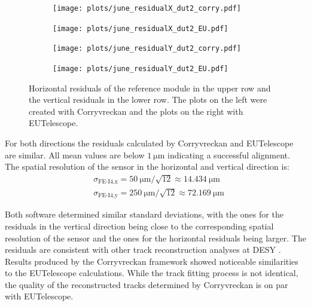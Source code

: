 \begin{figure}[H]
  \hspace{-0.4cm}
  \begin{subfigure}{0.51\textwidth}
      \texttt{[image: plots/june\_residualX\_dut2\_corry.pdf]}
  \end{subfigure}
  \begin{subfigure}{0.51\textwidth}
      \hspace{-0.19cm}
      \texttt{[image: plots/june\_residualX\_dut2\_EU.pdf]}
  \end{subfigure}
  \begin{subfigure}{0.51\textwidth}
    \hspace{-0.4cm}
      \texttt{[image: plots/june\_residualY\_dut2\_corry.pdf]}
  \end{subfigure}
  \begin{subfigure}{0.51\textwidth}
    \hspace{-0.4cm}
      \hspace{-0.19cm}
      \texttt{[image: plots/june\_residualY\_dut2\_EU.pdf]}
  \end{subfigure}
  \caption{Horizontal residuals of the reference module in the upper row and the vertical residuals in the lower row. The plots on the left
  were created with Corryvreckan and the plots on the right with EUTelescope.}
  \label{fig:residual_dut}
\end{figure}

For both directions the residuals calculated by Corryvreckan and EUTelescope are similar. All mean values are below $\SI{1}{\micro\meter}$
indicating a successful alignment. The spatial resolution of the sensor in the horizontal and vertical direction is:
\begin{align*}
  &\sigma_{\text{FE-I4},\text{x}} = \SI{50}{\micro\meter}/\sqrt{12} \approx \SI{14.434}{\micro\meter} \\
  &\sigma_{\text{FE-I4},\text{y}} = \SI{250}{\micro\meter}/\sqrt{12} \approx \SI{72.169}{\micro\meter}
\end{align*}

Both software determined similar standard deviations,
with the ones for the residuals in the vertical direction being close to
the corresponding spatial resolution of the sensor and the ones for the horizontal residuals being larger. The residuals are consistent with other track reconstruction
analyses at DESY \cite{resolution}.\\
Results produced by the Corryvreckan framework showed noticeable similarities to the EUTelescope calculations. While the track
fitting process is not identical, the quality of the reconstructed tracks determined by Corryvreckan is on par with EUTelescope.
